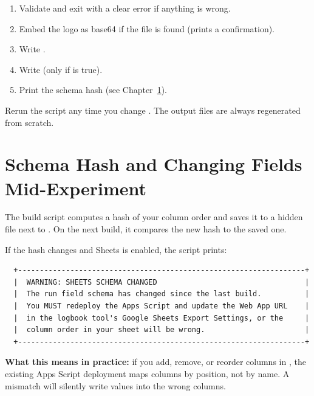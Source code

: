 \begin{enumerate}
    \item Validate  and exit with a clear error if anything
          is wrong.
    \item Embed the logo as base64 if the file is found (prints a
          confirmation).
    \item Write .
    \item Write  (only if
           is true).
    \item Print the schema hash (see Chapter~\ref{ch:schema}).
\end{enumerate}

Rerun the script any time you change . The output files are
always regenerated from scratch.

\chapter{Schema Hash and Changing Fields Mid-Experiment}
\label{ch:schema}

The build script computes a hash of your  column order and
saves it to a hidden file  next to . On
the next build, it compares the new hash to the saved one.

If the hash changes and Sheets is enabled, the script prints:

\begin{lstlisting}
  +------------------------------------------------------------------+
  |  WARNING: SHEETS SCHEMA CHANGED                                  |
  |  The run field schema has changed since the last build.          |
  |  You MUST redeploy the Apps Script and update the Web App URL    |
  |  in the logbook tool's Google Sheets Export Settings, or the     |
  |  column order in your sheet will be wrong.                       |
  +------------------------------------------------------------------+
\end{lstlisting}

\textbf{What this means in practice:} if you add, remove, or reorder columns
in , the existing Apps Script deployment maps columns by
position, not by name. A mismatch will silently write values into the wrong
columns.


